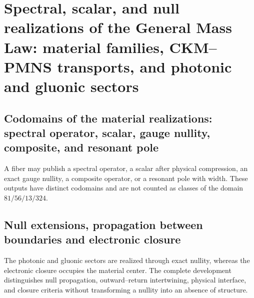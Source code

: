 \chapter{Spectral, scalar, and null realizations of the General Mass Law: material families, CKM–PMNS transports, and photonic and gluonic sectors}
\label{chap:realizaciones-familias-mezclas-masas}

\section{Codomains of the material realizations: spectral operator, scalar, gauge nullity, composite, and resonant pole}
A fiber may publish a spectral operator, a scalar after physical
compression, an exact gauge nullity, a composite operator, or a
resonant pole with width. These outputs have distinct codomains and are not
counted as classes of the domain \(81/56/13/324\).

\section{Null extensions, propagation between boundaries and electronic closure}

The photonic and gluonic sectors are realized through exact nullity, whereas
the electronic closure occupies the material center. The complete development
distinguishes null propagation, outward--return intertwining, physical interface, and
closure criteria without transforming a nullity into an absence of structure.

\begingroup
\let\chapter\section
\let\section\subsection
\let\subsection\subsubsection
\let\subsubsection\paragraph
\let\clearpage\relax
\let\cleardoublepage\relax

\endgroup

